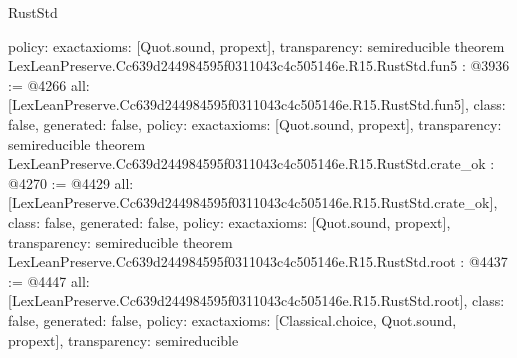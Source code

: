 \begin{lexlean}{RustStd}
\begin{coremodule}
{  policy: exact{axioms: [Quot.sound, propext]},
  transparency: semireducible
}
theorem LexLeanPreserve.Cc639d244984595f0311043c4c505146e.R15.RustStd.fun5 : @3936 := @4266 {
  all: [LexLeanPreserve.Cc639d244984595f0311043c4c505146e.R15.RustStd.fun5],
  class: false,
  generated: false,
  policy: exact{axioms: [Quot.sound, propext]},
  transparency: semireducible
}
theorem LexLeanPreserve.Cc639d244984595f0311043c4c505146e.R15.RustStd.crate_ok : @4270 := @4429 {
  all: [LexLeanPreserve.Cc639d244984595f0311043c4c505146e.R15.RustStd.crate_ok],
  class: false,
  generated: false,
  policy: exact{axioms: [Quot.sound, propext]},
  transparency: semireducible
}
theorem LexLeanPreserve.Cc639d244984595f0311043c4c505146e.R15.RustStd.root : @4437 := @4447 {
  all: [LexLeanPreserve.Cc639d244984595f0311043c4c505146e.R15.RustStd.root],
  class: false,
  generated: false,
  policy: exact{axioms: [Classical.choice, Quot.sound, propext]},
  transparency: semireducible
}


\end{coremodule}
\end{lexlean}

